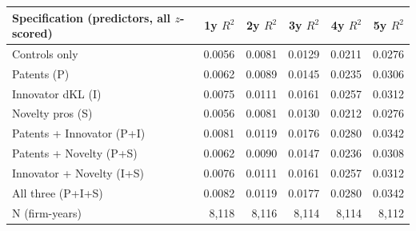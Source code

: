 \begin{tabular}{lrrrrr}
\toprule
Specification (predictors, all $z$-scored) & 1y $R^2$ & 2y $R^2$ & 3y $R^2$ & 4y $R^2$ & 5y $R^2$ \\
\midrule
Controls only & 0.0056 & 0.0081 & 0.0129 & 0.0211 & 0.0276 \\
Patents (P) & 0.0062 & 0.0089 & 0.0145 & 0.0235 & 0.0306 \\
Innovator dKL (I) & 0.0075 & 0.0111 & 0.0161 & 0.0257 & 0.0312 \\
Novelty pros (S) & 0.0056 & 0.0081 & 0.0130 & 0.0212 & 0.0276 \\
Patents + Innovator (P+I) & 0.0081 & 0.0119 & 0.0176 & 0.0280 & 0.0342 \\
Patents + Novelty (P+S) & 0.0062 & 0.0090 & 0.0147 & 0.0236 & 0.0308 \\
Innovator + Novelty (I+S) & 0.0076 & 0.0111 & 0.0161 & 0.0257 & 0.0312 \\
All three (P+I+S) & 0.0082 & 0.0119 & 0.0177 & 0.0280 & 0.0342 \\
\midrule
N (firm-years) & 8,118 & 8,116 & 8,114 & 8,114 & 8,112 \\
\bottomrule
\end{tabular}
